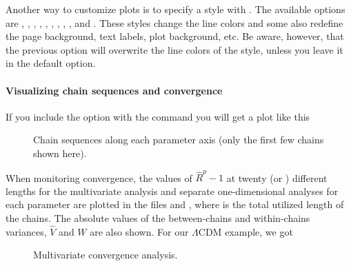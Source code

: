 \documentclass[letterpaper,12pt,english]{sphinxhowto}
\begin{document}
Another way to customize plots is to specify a style with .
The available options are , , ,
, , ,  ,
, ,  and
.
These styles change the line colors and some also redefine the page background,
text labels, plot background, etc.
Be aware, however, that the previous option  will overwrite
the line colors of the style, unless you leave it in the default 
option.


\paragraph{Visualizing chain sequences and convergence}
\label{\detokenize{MCMC:visualizing-chain-sequences-and-convergence}}
If you include the option  with the  command you will
get a plot like this

\begin{figure}[!tb]
\centering
\capstart

\noindent{}
\caption{Chain sequences along each parameter axis (only the first few chains shown here).}\label{\detokenize{MCMC:id11}}\end{figure}

When monitoring convergence, the values of \(\hat{R}^p - 1\) at twenty (or
) different lengths for the multivariate analysis and separate
one-dimensional analyses for each parameter are plotted in the files
 and , where
 is the total utilized length of the chains.
The absolute values of the between-chains and within-chains variances,
\(\hat{V}\) and \(W\) are also shown.
For our \(\Lambda\text{CDM}\) example, we got

\begin{figure}[!tb]
\centering
\capstart

\noindent{}
\caption{Multivariate convergence analysis.}\label{\detokenize{MCMC:id12}}\end{figure}
\end{document}
